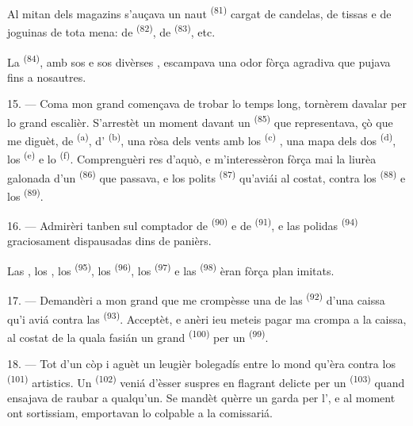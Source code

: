 Al mitan dels magazins s'auçava un naut 
\textsuperscript{(81)} cargat de candelas, de tissas e de joguinas de tota mena:
de  \textsuperscript{(82)}, de 
\textsuperscript{(83)}, etc.

La  \textsuperscript{(84)}, amb sos  e sos
divèrses , escampava una odor fòrça agradiva que pujava fins a
nosautres.

\VUsaut{3.4mm}
\VUsaut{2.8mm}

15. --- Coma mon grand començava de trobar lo temps long, tornèrem davalar per lo
grand escalièr. S'arrestèt un moment davant un 
\textsuperscript{(85)} que representava, çò que me diguèt, de 
\textsuperscript{(a)}, d'
\textsuperscript{(b)}, una ròsa dels vents amb los 
\textsuperscript{(c)} , una mapa dels dos
 \textsuperscript{(d)}, los 
\textsuperscript{(e)} e lo  \textsuperscript{(f)}.
Comprenguèri res d'aquò, e m'interessèron fòrça mai la liurèa galonada d'un
 \textsuperscript{(86)} que passava, e los polits
 \textsuperscript{(87)} qu'aviái al costat, contra los
 \textsuperscript{(88)} e los 
\textsuperscript{(89)}.

16. --- Admirèri tanben sul comptador de  \textsuperscript{(90)} e
de  \textsuperscript{(91)}, e las polidas
 \textsuperscript{(94)} graciosament dispausadas dins
de panièrs.

Las , los , los 
\textsuperscript{(95)}, los  \textsuperscript{(96)}, los
 \textsuperscript{(97)} e las 
\textsuperscript{(98)} èran fòrça plan imitats.

\VUsaut{4.4mm}
\VUsaut{2.8mm}

17. --- Demandèri a mon grand que me crompèsse una de las  \textsuperscript{(92)} d'una caissa qu'i aviá contra las  \textsuperscript{(93)}. Acceptèt, e anèri ieu meteis pagar ma crompa a la
caissa, al costat de la quala fasián un grand 
\textsuperscript{(100)} per un  \textsuperscript{(99)}.

18. --- Tot d'un còp i aguèt un leugièr bolegadís entre lo mond qu'èra contra los
 \textsuperscript{(101)} artistics. Un 
\textsuperscript{(102)} veniá d'èsser suspres en flagrant delicte per un
 \textsuperscript{(103)} quand ensajava de raubar
a qualqu'un. Se mandèt quèrre un garda per l', e al moment ont
sortissiam, emportavan lo colpable a la comissariá.
\VUsaut{6.0mm}
\VUfilet{22mm}
